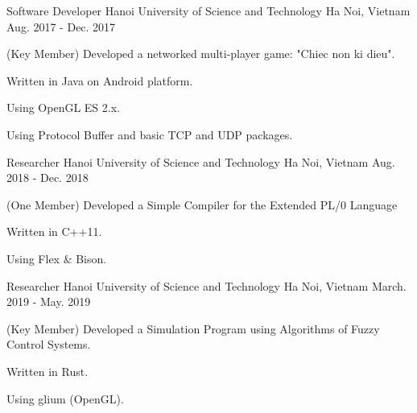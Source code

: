 


\begin{cventries}


\cventry
{Software Developer} %
{Hanoi University of Science and Technology} %
{Ha Noi, Vietnam} %
{Aug. 2017 - Dec. 2017} %
{ %
\begin{cvitems}
\item{(Key Member) Developed a networked multi-player game: "Chiec non ki dieu".}
\item{Written in Java on Android platform.}
\item{Using OpenGL ES 2.x.}
\item{Using Protocol Buffer and basic TCP and UDP packages.}
\end{cvitems}
}


\cventry
{Researcher} %
{Hanoi University of Science and Technology} %
{Ha Noi, Vietnam} %
{Aug. 2018 - Dec. 2018} %
{ %
\begin{cvitems}
\item{(One Member) Developed a Simple Compiler for the Extended PL/0 Language}
\item{Written in C++11.}
\item{Using Flex \& Bison.}
\end{cvitems}
}


\cventry
{Researcher} %
{Hanoi University of Science and Technology} %
{Ha Noi, Vietnam} %
{March. 2019 - May. 2019} %
{ %
\begin{cvitems}
\item{(Key Member) Developed a Simulation Program using Algorithms of Fuzzy Control Systems.}
\item{Written in Rust.}
\item{Using glium (OpenGL).}
\end{cvitems}
}


\end{cventries}
